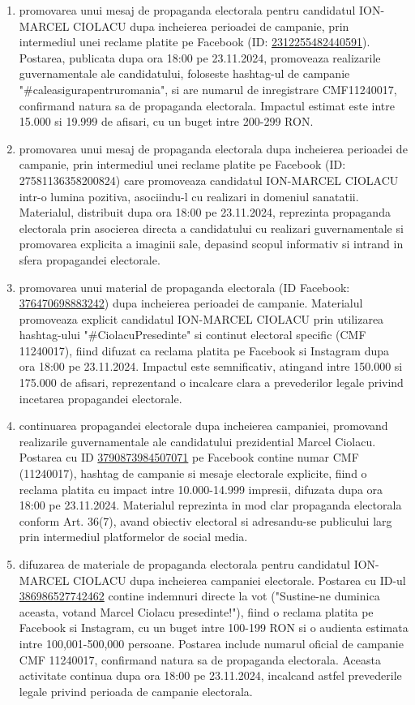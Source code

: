 \documentclass[a4paper,12pt]{article}
\begin{document}
\begin{enumerate}[leftmargin=*, label=\arabic*.)]
    \item promovarea unui mesaj de propaganda electorala pentru candidatul ION-MARCEL CIOLACU dupa incheierea perioadei de campanie, prin intermediul unei reclame platite pe Facebook (ID: \href{https://www.facebook.com/ads/library/?id=2312255482440591}{2312255482440591}). Postarea, publicata dupa ora 18:00 pe 23.11.2024, promoveaza realizarile guvernamentale ale candidatului, foloseste hashtag-ul de campanie "\#caleasigurapentruromania", si are numarul de inregistrare CMF11240017, confirmand natura sa de propaganda electorala. Impactul estimat este intre 15.000 si 19.999 de afisari, cu un buget intre 200-299 RON.
    \item promovarea unui mesaj de propaganda electorala dupa incheierea perioadei de campanie, prin intermediul unei reclame platite pe Facebook (ID: 27581136358200824) care promoveaza candidatul ION-MARCEL CIOLACU intr-o lumina pozitiva, asociindu-l cu realizari in domeniul sanatatii. Materialul, distribuit dupa ora 18:00 pe 23.11.2024, reprezinta propaganda electorala prin asocierea directa a candidatului cu realizari guvernamentale si promovarea explicita a imaginii sale, depasind scopul informativ si intrand in sfera propagandei electorale.
    \item promovarea unui material de propaganda electorala (ID Facebook: \href{https://www.facebook.com/ads/library/?id=376470698883242}{376470698883242}) dupa incheierea perioadei de campanie. Materialul promoveaza explicit candidatul ION-MARCEL CIOLACU prin utilizarea hashtag-ului "\#CiolacuPresedinte" si continut electoral specific (CMF 11240017), fiind difuzat ca reclama platita pe Facebook si Instagram dupa ora 18:00 pe 23.11.2024. Impactul este semnificativ, atingand intre 150.000 si 175.000 de afisari, reprezentand o incalcare clara a prevederilor legale privind incetarea propagandei electorale.
    \item continuarea propagandei electorale dupa incheierea campaniei, promovand realizarile guvernamentale ale candidatului prezidential Marcel Ciolacu. Postarea cu ID \href{https://www.facebook.com/ads/library/?id=3790873984507071}{3790873984507071} pe Facebook contine numar CMF (11240017), hashtag de campanie si mesaje electorale explicite, fiind o reclama platita cu impact intre 10.000-14.999 impresii, difuzata dupa ora 18:00 pe 23.11.2024. Materialul reprezinta in mod clar propaganda electorala conform Art. 36(7), avand obiectiv electoral si adresandu-se publicului larg prin intermediul platformelor de social media.
    \item difuzarea de materiale de propaganda electorala pentru candidatul ION-MARCEL CIOLACU dupa incheierea campaniei electorale. Postarea cu ID-ul \href{https://www.facebook.com/ads/library/?id=386986527742462}{386986527742462} contine indemnuri directe la vot ("Sustine-ne duminica aceasta, votand Marcel Ciolacu presedinte!"), fiind o reclama platita pe Facebook si Instagram, cu un buget intre 100-199 RON si o audienta estimata intre 100,001-500,000 persoane. Postarea include numarul oficial de campanie CMF 11240017, confirmand natura sa de propaganda electorala. Aceasta activitate continua dupa ora 18:00 pe 23.11.2024, incalcand astfel prevederile legale privind perioada de campanie electorala.

\end{enumerate}
\end{document}
